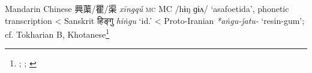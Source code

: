 \begin{etymology}\label{ety:xingqu}
Mandarin Chinese {興蕖/瞿/渠} \textit{xīngqú} \textsc{mc} MC /hɨŋ ɡɨʌ/ `asafoetida', phonetic transcription
< Sanskrit {हिङ्गु} \textit{hiṅgu} `id.'
< Proto-Iranian \textit{*aṅgu-ǰatu-} `resin-gum'; cf. Tokharian B, Khotanese\footnote{\textcite{leung_itinerary_2019}; \textcite[353]{laufer_sino-iranica_1919}; \textcite[7]{adams_dictionary_2013}}
\end{etymology}